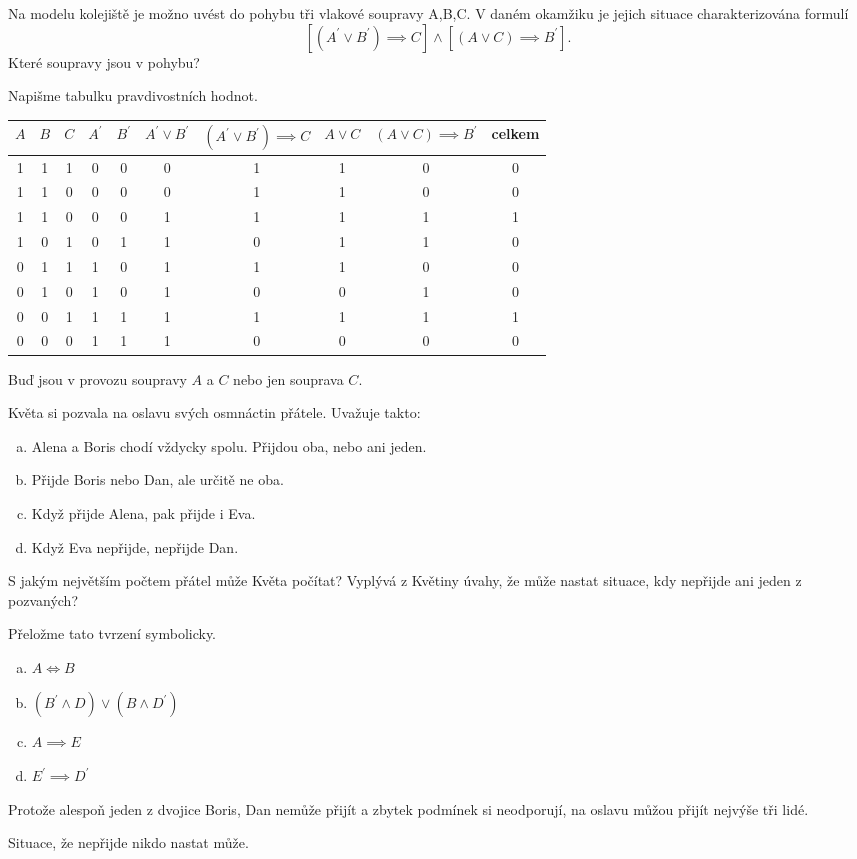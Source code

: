 \begin{example}[SMP 144/8]
  Na modelu kolejiště je možno uvést do pohybu tři vlakové soupravy A,B,C. V daném okamžiku je jejich
situace charakterizována formulí $$\left[(A^\prime \lor B^\prime) \implies C\right]\land\left[(A \lor C) \implies B^\prime\right].$$ Které soupravy jsou v pohybu?

\rm Napišme tabulku pravdivostních hodnot.
\begin{center}
  \begin{tabular}{c c c c c | c c c c c}
    $A$ & $B$ & $C$ & $A^\prime$ & $B^\prime$ & $A^\prime \lor B^\prime$ & $(A^\prime \lor B^\prime) \implies C$ & $A\lor C$ & $(A \lor C) \implies B^\prime $ & celkem\\
    \hline
    1 & 1 & 1 & 0 & 0 & 0 & 1 & 1 & 0 & 0 \\
    1 & 1 & 0 & 0 & 0 & 0 & 1 & 1 & 0 & 0 \\
    1 & 1 & 0 & 0 & 0 & 1 & 1 & 1 & 1 & 1 \\
    1 & 0 & 1 & 0 & 1 & 1 & 0 & 1 & 1 & 0 \\
    0 & 1 & 1 & 1 & 0 & 1 & 1 & 1 & 0 & 0 \\
    0 & 1 & 0 & 1 & 0 & 1 & 0 & 0 & 1 & 0 \\
    0 & 0 & 1 & 1 & 1 & 1 & 1 & 1 & 1 & 1 \\
    0 & 0 & 0 & 1 & 1 & 1 & 0 & 0 & 0 & 0
  \end{tabular}
\end{center}
Buď jsou v provozu soupravy $A$ a $C$ nebo jen souprava $C$.
\end{example}

\begin{example}[SMP 144/10]
  Květa si pozvala na oslavu svých osmnáctin přátele. Uvažuje takto:
  \begin{enumerate}[a.]
    \item Alena a Boris chodí vždycky spolu. Přijdou oba, nebo ani jeden.
    \item Přijde Boris nebo Dan, ale určitě ne oba.
    \item Když přijde Alena, pak přijde i Eva.
    \item Když Eva nepřijde, nepřijde Dan.
  \end{enumerate}
  S jakým největším počtem přátel může Květa počítat? Vyplývá z Květiny úvahy, že může nastat situace, kdy nepřijde ani jeden z pozvaných?

  \rm Přeložme tato tvrzení symbolicky.
  \begin{enumerate}[a.]
    \item $A\iff B$
    \item $(B^\prime \land D) \lor (B \land D^\prime)$
    \item $A\implies E$
    \item $E^\prime \implies D^\prime$
  \end{enumerate}
  Protože alespoň jeden z dvojice Boris, Dan nemůže přijít a zbytek podmínek si neodporují, na oslavu můžou přijít nejvýše tři lidé.

  Situace, že nepřijde nikdo nastat může.
\end{example}

